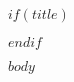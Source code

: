 \documentclass[12pt]{extarticle} %
\begin{document}
\tableofcontents
\newpage

$if(title)$
\maketitle
$endif$

$body$
\end{document}
